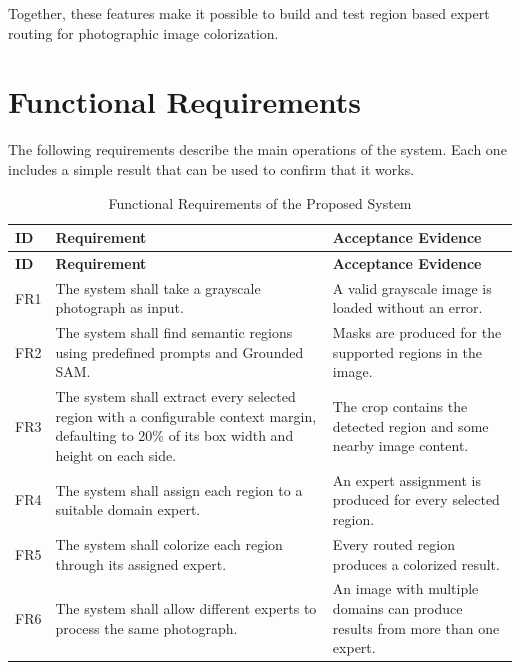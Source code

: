 \documentclass{FastFyp}
\begin{document}
Together, these features make it possible to build and test region based expert routing for photographic image colorization.

\section{Functional Requirements}

The following requirements describe the main operations of the system. Each one includes a simple result that can be used to confirm that it works.

\begin{longtable}{|p{1.2cm}|p{7.1cm}|p{6.0cm}|}
\caption{Functional Requirements of the Proposed System}
\label{tab:functional-requirements}\\
\hline
\textbf{ID} & \textbf{Requirement} & \textbf{Acceptance Evidence} \\ \hline
\endfirsthead

\hline
\textbf{ID} & \textbf{Requirement} & \textbf{Acceptance Evidence} \\ \hline
\endhead

FR1 &
The system shall take a grayscale photograph as input. &
A valid grayscale image is loaded without an error. \\ \hline

FR2 &
The system shall find semantic regions using predefined prompts and Grounded SAM. &
Masks are produced for the supported regions in the image. \\ \hline

FR3 &
The system shall extract every selected region with a configurable context margin, defaulting to 20\% of its box width and height on each side. &
The crop contains the detected region and some nearby image content. \\ \hline

FR4 &
The system shall assign each region to a suitable domain expert. &
An expert assignment is produced for every selected region. \\ \hline

FR5 &
The system shall colorize each region through its assigned expert. &
Every routed region produces a colorized result. \\ \hline

FR6 &
The system shall allow different experts to process the same photograph. &
An image with multiple domains can produce results from more than one expert. \\ \hline


\end{longtable}
\end{document}
